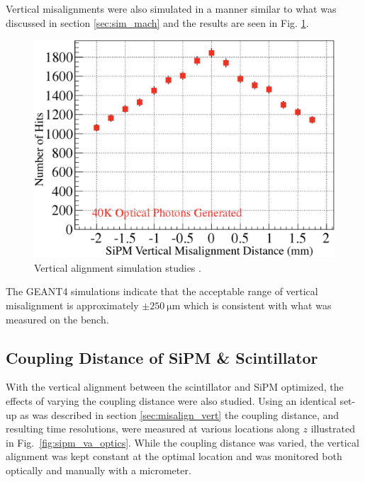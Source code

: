Vertical misalignments were also simulated in a manner similar to what was discussed in section \ref{sec:sim_mach} and the results are seen in Fig. \ref{fig:vertical_sim}.
	\begin{figure}[!htb]
		\centering
		\includegraphics[width=0.8\columnwidth]{misalignment/figs/vertical_sim}
		\caption{Vertical alignment simulation studies \cite{puneet_sim_talk}.}
		\label{fig:vertical_sim}
	\end{figure}
The GEANT4 simulations indicate that the acceptable range of vertical misalignment is approximately $\pm 250\ \mathrm{\mu m}$ \cite{puneet_sim_talk} which is consistent with what was measured on the bench.

\subsection{Coupling Distance of SiPM \& Scintillator}

With the vertical alignment between the scintillator and SiPM optimized, the effects of varying the coupling distance were also studied.  Using an identical set-up as was described in section \ref{sec:misalign_vert} the coupling distance, and resulting time resolutions, were measured at various locations along $z$ illustrated in Fig.~\ref{fig:sipm_va_optics}.  While the coupling distance was varied, the vertical alignment was kept constant at the optimal location and was monitored both optically and manually with a micrometer.

